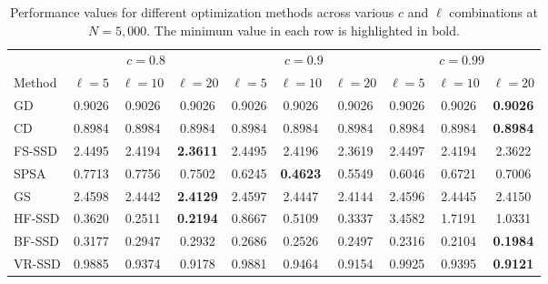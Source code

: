 \documentclass[10pt]{article} %
\numberwithin{equation}{section}
\theoremstyle{plain}
\theoremstyle{definition}
\newcommand{\<}{\langle}
\renewcommand{\>}{\rangle}
\renewcommand{\(}{\left(}
\renewcommand{\)}{\right)}
\renewcommand{\[}{\left[}
\renewcommand{\]}{\right]}
\begin{document}
    \begin{table}[ht]
        \centering
        \begin{tabular}{lccccccccc}%
            \toprule
            & \multicolumn{3}{c}{$c=0.8$} & \multicolumn{3}{c}{$c=0.9$} & \multicolumn{3}{c}{$c=0.99$} \\
            \cmidrule(r){2-4} \cmidrule(lr){5-7} \cmidrule(l){8-10} 
            Method & $\ell=5$ & $\ell=10$ & $\ell=20$
            & $\ell=5$ & $\ell=10$ & $\ell=20$
            & $\ell=5$ & $\ell=10$ & $\ell=20$ \\
            \midrule
            GD & 0.9026 & 0.9026 & 0.9026 & 0.9026 & 0.9026 & 0.9026 & 0.9026 & 0.9026 & \textbf{0.9026} \\
            CD & 0.8984 & 0.8984 & 0.8984 & 0.8984 & 0.8984 & 0.8984 & 0.8984 & 0.8984 & \textbf{0.8984} \\
            FS-SSD & 2.4495 & 2.4194 & \textbf{2.3611} & 2.4495 & 2.4196 & 2.3619 & 2.4497 & 2.4194 & 2.3622 \\
            SPSA & 0.7713 & 0.7756 & 0.7502 & 0.6245 & \textbf{0.4623} & 0.5549 & 0.6046 & 0.6721 & 0.7006 \\ 
            GS & 2.4598 & 2.4442 & \textbf{2.4129} & 2.4597 & 2.4447 & 2.4144 & 2.4596 & 2.4445 & 2.4150 \\ 
            HF-SSD & 0.3620 & 0.2511 & \textbf{0.2194} & 0.8667 & 0.5109 & 0.3337 & 3.4582 & 1.7191 & 1.0331 \\ 
            BF-SSD & 0.3177 & 0.2947 & 0.2932 & 0.2686 & 0.2526 & 0.2497 & 0.2316 & 0.2104 & \textbf{0.1984} \\ 
            VR-SSD & 0.9885 & 0.9374 & 0.9178 & 0.9881 & 0.9464 & 0.9154 & 0.9925 & 0.9395 & \textbf{0.9121} \\
            \bottomrule
        \end{tabular}
        \caption{Performance values for different optimization methods across various $c$ and $\ell$ combinations at $N=5,\!000$. The minimum value in each row is highlighted in bold.}
        \label{tab:worst_performance_table2}
    \end{table}
\end{document}
